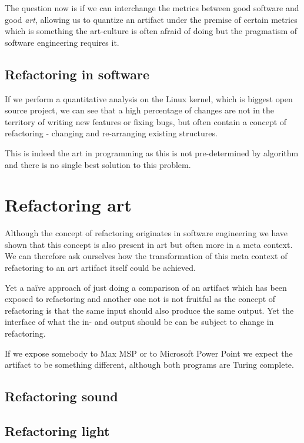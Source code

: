 \documentclass[10pt,twocolumn,letterpaper]{article}
\begin{document}
The question now is if we can interchange the metrics between good software and good \textit{art}, allowing
us to quantize an artifact under the premise of certain metrics which is something the art-culture is often
afraid of doing but the pragmatism of software engineering requires it.

\subsection{Refactoring in software}

If we perform a quantitative analysis on the Linux kernel, which is biggest open source project, we can see
that a high percentage of changes are not in the territory of writing new features or fixing bugs, but often 
contain a concept of refactoring - changing and re-arranging existing structures.

This is indeed the art in programming as this is not pre-determined by algorithm and there is no
single best solution to this problem.

\section{Refactoring art}

Although the concept of refactoring originates in software engineering we have shown that this concept is also
present in art but often more in a meta context.
We can therefore ask ourselves how the transformation of this meta context of refactoring to an art artifact itself
could be achieved.

Yet a naïve approach of just doing a comparison of an artifact which has been exposed to refactoring and another one
not is not fruitful as the concept of refactoring is that the same input should also produce the same output.
Yet the interface of what the in- and output should be can be subject to change in refactoring.

If we expose somebody to Max MSP or to Microsoft Power Point we expect the artifact to be something different, although
both programs are Turing complete.

\subsection{Refactoring sound}

\subsection{Refactoring light}
\end{document}
